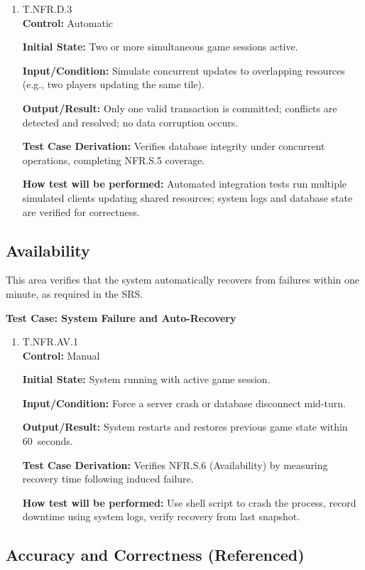 \documentclass[12pt, titlepage]{article}
\begin{document}
\begin{enumerate}
\item T.NFR.D.3 \\
\textbf{Control:} Automatic

\textbf{Initial State:} Two or more simultaneous game sessions active.

\textbf{Input/Condition:} Simulate concurrent updates to overlapping resources (e.g., two players updating the same tile).

\textbf{Output/Result:} Only one valid transaction is committed; conflicts are detected and resolved; no data corruption occurs.

\textbf{Test Case Derivation:} Verifies database integrity under concurrent operations, completing NFR.S.5 coverage.

\textbf{How test will be performed:} Automated integration tests run multiple simulated clients updating shared resources; system logs and database state are verified for correctness.
\end{enumerate}


\subsection{Availability}

This area verifies that the system automatically recovers from failures within one minute, as required in the SRS.

\textbf{Test Case: System Failure and Auto-Recovery}

\begin{enumerate}
\item T.NFR.AV.1 \\
\textbf{Control:} Manual

\textbf{Initial State:} System running with active game session.

\textbf{Input/Condition:} Force a server crash or database disconnect mid-turn.

\textbf{Output/Result:} System restarts and restores previous game state within 60~seconds.

\textbf{Test Case Derivation:} Verifies NFR.S.6 (Availability) by measuring recovery time following induced failure.

\textbf{How test will be performed:} Use shell script to crash the process, record downtime using system logs, verify recovery from last snapshot.
\end{enumerate}

\subsection{Accuracy and Correctness (Referenced)}
\end{document}
